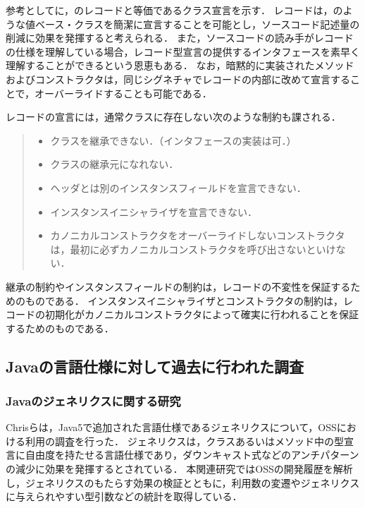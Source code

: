 参考としてに，のレコードと等価であるクラス宣言を示す．
レコードは，のような値ベース・クラスを簡潔に宣言することを可能とし，ソースコード記述量の削減に効果を発揮すると考えられる．
また，ソースコードの読み手がレコードの仕様を理解している場合，レコード型宣言の提供するインタフェースを素早く理解することができるという恩恵もある．
なお，暗黙的に実装されたメソッドおよびコンストラクタは，同じシグネチャでレコードの内部に改めて宣言することで，オーバーライドすることも可能である．

レコードの宣言には，通常クラスに存在しない次のような制約も課される\cite{JLS17}．

\begin{quote}
    \begin{itemize}
        \item クラスを継承できない．（インタフェースの実装は可．）
        \item クラスの継承元になれない．
        \item ヘッダとは別のインスタンスフィールドを宣言できない．
        \item インスタンスイニシャライザを宣言できない．
        \item カノニカルコンストラクタをオーバーライドしないコンストラクタは，最初に必ずカノニカルコンストラクタを呼び出さないといけない．
    \end{itemize}
\end{quote}

継承の制約やインスタンスフィールドの制約は，レコードの不変性を保証するためのものである．
インスタンスイニシャライザとコンストラクタの制約は，レコードの初期化がカノニカルコンストラクタによって確実に行われることを保証するためのものである．

\subsection{Javaの言語仕様に対して過去に行われた調査\label{related_works}}
\subsubsection{Javaのジェネリクスに関する研究\label{generics_research}}
Chrisらは，Java5で追加された言語仕様であるジェネリクスについて，OSSにおける利用の調査を行った\cite{Generics_Research}．
ジェネリクスは，クラスあるいはメソッド中の型宣言に自由度を持たせる言語仕様であり，ダウンキャスト式などのアンチパターンの減少に効果を発揮するとされている．
本関連研究ではOSSの開発履歴を解析し，ジェネリクスのもたらす効果の検証とともに，利用数の変遷やジェネリクスに与えられやすい型引数などの統計を取得している．

